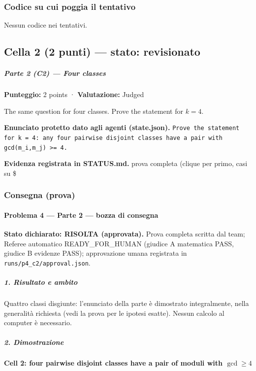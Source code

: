 \documentclass[11pt,a4paper]{article}
\begin{document}
\subsubsection{Codice su cui poggia il tentativo}
Nessun codice nei tentativi.

\subsection{Cella 2 (2 punti) — stato: revisionato}
\subparagraph{Parte 2 (C2) --- Four
classes}\label{parte-2-c2-four-classes}

\textbf{Punteggio:} 2 points · \textbf{Valutazione:} Judged

The same question for four classes. Prove the statement for \(k = 4\).

\textbf{Enunciato protetto dato agli agenti (state.json).} \texttt{Prove the statement for k = 4: any four pairwise disjoint classes have a pair with gcd(m\_i,m\_j) \textgreater{}= 4.}

\textbf{Evidenza registrata in STATUS.md.} prova completa (clique per primo, casi su \$

\subsubsection{Consegna (prova)}
\paragraph{Problema 4 --- Parte 2 --- bozza di
consegna}\label{problema-4-parte-2-bozza-di-consegna}

\textbf{Stato dichiarato: RISOLTA (approvata).} Prova completa scritta
dal team; Referee automatico READY\_FOR\_HUMAN (giudice A matematica
PASS, giudice B evidenze PASS); approvazione umana registrata in
\texttt{runs/p4\_c2/approval.json}.

\subparagraph{1. Risultato e ambito}\label{risultato-e-ambito}

Quattro classi disgiunte: l'enunciato della parte è dimostrato
integralmente, nella generalità richiesta (vedi la prova per le ipotesi
esatte). Nessun calcolo al computer è necessario.

\subparagraph{2. Dimostrazione}\label{dimostrazione}

\paragraph{\texorpdfstring{Cell 2: four pairwise disjoint classes have a
pair of moduli with
\(\gcd\ge4\)}{Cell 2: four pairwise disjoint classes have a pair of moduli with \textbackslash gcd\textbackslash ge4}}\label{cell-2-four-pairwise-disjoint-classes-have-a-pair-of-moduli-with-gcdge4}
\end{document}
